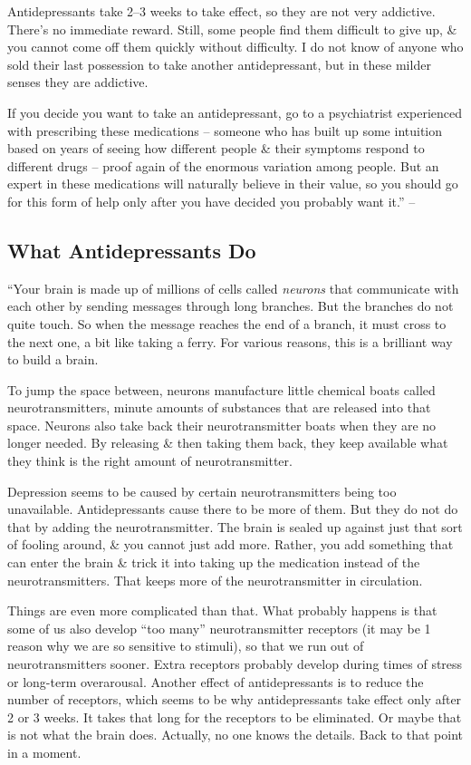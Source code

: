 \documentclass{article}
\numberwithin{equation}{section}
\begin{document}
Antidepressants take 2--3 weeks to take effect, so they are not very addictive. There's no immediate reward. Still, some people find them difficult to give up, \& you cannot come off them quickly without difficulty. I do not know of anyone who sold their last possession to take another antidepressant, but in these milder senses they are addictive.

If you decide you want to take an antidepressant, go to a psychiatrist experienced with prescribing these medications -- someone who has built up some intuition based on years of seeing how different people \& their symptoms respond to different drugs -- proof again of the enormous variation among people. But an expert in these medications will naturally believe in their value, so you should go for this form of help only after you have decided you probably want it.'' -- \cite[p. 229]{Aron2013}

\subsection{What Antidepressants Do}
``Your brain is made up of millions of cells called \textit{neurons} that communicate with each other by sending messages through long branches. But the branches do not quite touch. So when the message reaches the end of a branch, it must cross to the next one, a bit like taking a ferry. For various reasons, this is a brilliant way to build a brain.

To jump the space between, neurons manufacture little chemical boats called neurotransmitters, minute amounts of substances that are released into that space. Neurons also take back their neurotransmitter boats when they are no longer needed. By releasing \& then taking them back, they keep available what they think is the right amount of neurotransmitter.

Depression seems to be caused by certain neurotransmitters being too unavailable. Antidepressants cause there to be more of them. But they do not do that by adding the neurotransmitter. The brain is sealed up against just that sort of fooling around, \& you cannot just add more. Rather, you add something that can enter the brain \& trick it into taking up the medication instead of the neurotransmitters. That keeps more of the neurotransmitter in circulation.

Things are even more complicated than that. What probably happens is that some of us also develop ``too many'' neurotransmitter receptors (it may be 1 reason why we are so sensitive to stimuli), so that we run out of neurotransmitters sooner. Extra receptors probably develop during times of stress or long-term overarousal. Another effect of antidepressants is to reduce the number of receptors, which seems to be why antidepressants take effect only after 2 or 3 weeks. It takes that long for the receptors to be eliminated. Or maybe that is not what the brain does. Actually, no one knows the details. Back to that point in a moment.
\end{document}
